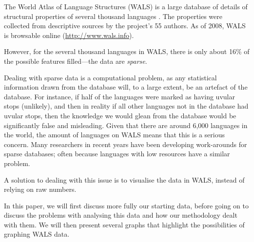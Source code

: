 \documentclass[11pt]{article}
\begin{document}
The World Atlas of Language Structures (WALS) is a large database of details of structural properties of several thousand languages \cite{wals-2011}. The properties were collected from descriptive sources by the project's 55 authors. As of 2008, WALS is browsable online (\url{http://www.wals.info}).

However, for the several thousand languages in WALS, there is only about 16\% of the possible features filled---the data are \emph{sparse}.

Dealing with sparse data is a computational problem, as any statistical information drawn from the database will, to a large extent, be an artefact of the database. For instance, if half of the languages were marked as having uvular stops (unlikely), and then in reality if all other languages not in the database had uvular stops, then the knowledge we would glean from the database would be significantly false and misleading. Given that there are around 6,000 languages in the world, the amount of languages on WALS means that this is a serious concern. Many researchers in recent years have been developing work-arounds for sparse databases; often because languages with low resources have a similar problem. %


A solution to dealing with this issue is to visualise the data in WALS, instead of relying on raw numbers.



In this paper, we will first discuss more fully our starting data, before going on to discuss the problems with analysing this data and how our methodology dealt with them. We will then present several graphs that highlight the possibilities of graphing WALS data. 
\end{document}
